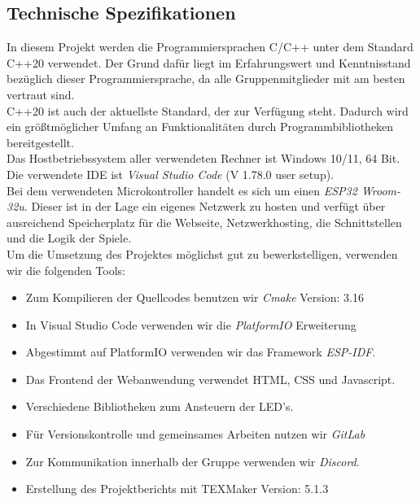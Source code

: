 \documentclass[12pt,a4paper]{article}
\begin{document}
\subsection{Technische Spezifikationen}
In diesem Projekt werden die Programmiersprachen C/C++ \hspace{0.5ex}unter dem Standard C++20 verwendet.
Der Grund dafür liegt im Erfahrungswert und Kenntnisstand bezüglich dieser Programmiersprache, da alle Gruppenmitglieder mit \hspace{0.5ex}am besten vertraut sind. \\
C++20 ist auch der aktuellste Standard, der zur Verfügung steht. Dadurch wird ein größtmöglicher Umfang an Funktionalitäten durch Programmbibliotheken bereitgestellt.
\vspace{1ex}\\
Das Hostbetriebssystem aller verwendeten Rechner ist Windows 10/11, 64 Bit.
\vspace{1ex}\\
Die verwendete IDE ist \textit{Visual Studio Code} (V 1.78.0 user setup). 
\vspace{1ex}\\
Bei dem verwendeten Microkontroller handelt es sich um einen \textit{ESP32 Wroom-32u}. Dieser ist in der Lage ein eigenes Netzwerk zu hosten und verfügt über ausreichend Speicherplatz für die Webseite, Netzwerkhosting, die Schnittstellen und die Logik der Spiele. 
\vspace{1ex}\\
Um die Umsetzung des Projektes möglichst gut zu bewerkstelligen, verwenden wir die folgenden Tools: 
\begin{itemize}
\item Zum Kompilieren der Quellcodes benutzen wir \textit{Cmake} Version: 3.16
\item In Visual Studio Code verwenden wir die \textit{PlatformIO} Erweiterung
\item Abgestimmt auf PlatformIO verwenden wir das Framework \textit{ESP-IDF}. 
\item Das Frontend der Webanwendung verwendet HTML, CSS und Javascript. 
\item Verschiedene Bibliotheken zum Ansteuern der LED's. 
\item Für Versionskontrolle und gemeinsames Arbeiten nutzen wir \textit{GitLab}
\item Zur Kommunikation innerhalb der Gruppe verwenden wir \textit{Discord}.
\item Erstellung des Projektberichts mit TEXMaker Version: 5.1.3 
\end{itemize}
\end{document}

